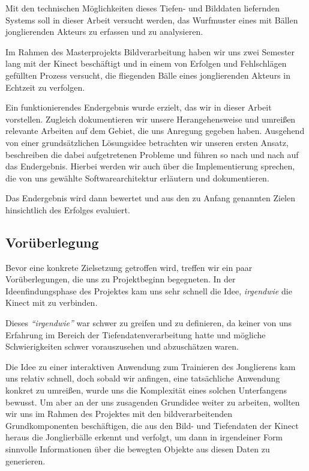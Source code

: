 \documentclass[12pt,a4paper,ngerman]{scrartcl}
\begin{document}
Mit den technischen Möglichkeiten dieses Tiefen- und Bilddaten liefernden Systems
soll in dieser Arbeit versucht werden, das Wurfmuster eines mit Bällen jonglierenden
Akteurs zu erfassen und zu analysieren. %

Im Rahmen des Masterprojekts Bildverarbeitung haben wir uns zwei Semester lang mit
der Kinect beschäftigt und in einem von Erfolgen und Fehlschlägen gefüllten Prozess
versucht, die fliegenden Bälle eines jonglierenden Akteurs in Echtzeit zu verfolgen.

Ein funktionierendes Endergebnis wurde erzielt, das wir in dieser Arbeit vorstellen.
Zugleich dokumentieren wir unsere Herangehensweise und umreißen relevante Arbeiten
auf dem Gebiet, die uns Anregung gegeben haben. Ausgehend von einer grundsätzlichen
Lösungsidee betrachten wir unseren ersten Ansatz, beschreiben die dabei aufgetretenen
Probleme und führen so nach und nach auf das Endergebnis. Hierbei werden wir auch
über die Implementierung sprechen, die von uns gewählte Softwarearchitektur
erläutern und dokumentieren.

Das Endergebnis wird dann bewertet und aus den zu Anfang genannten Zielen
hinsichtlich des Erfolges evaluiert. %

\newpage

\subsection{Vorüberlegung}

Bevor eine konkrete Zielsetzung getroffen wird, treffen wir ein paar Vorüberlegungen,
die uns zu Projektbeginn begegneten. In der Ideenfindungsphase des Projektes kam uns
sehr schnell die Idee, \textit{irgendwie} die Kinect mit  zu
verbinden.

Dieses \textit{``irgendwie''} war schwer zu greifen und zu definieren, da keiner von
uns Erfahrung im Bereich der Tiefendatenverarbeitung hatte und mögliche
Schwierigkeiten schwer vorauszusehen und abzuschätzen waren.

Die Idee zu einer interaktiven Anwendung zum Trainieren des Jonglierens kam uns
relativ schnell, doch sobald wir anfingen, eine tatsächliche Anwendung konkret zu
umreißen, wurde uns die Komplexität eines solchen Unterfangens bewusst. Um aber
an der uns zusagenden Grundidee weiter zu arbeiten, wollten wir uns im Rahmen des
Projektes mit den bildverarbeitenden Grundkomponenten beschäftigen, die aus
den Bild- und Tiefendaten der Kinect heraus die Jonglierbälle erkennt und verfolgt,
um dann in irgendeiner Form sinnvolle Informationen über die bewegten Objekte aus diesen
Daten zu generieren.
\end{document}
